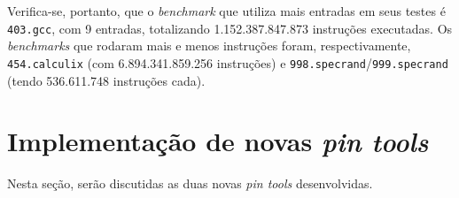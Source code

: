 \documentclass[12pt]{article}
\begin{document}

Verifica-se, portanto, que o \textit{benchmark} que utiliza mais entradas em
seus testes é \texttt{403.gcc}, com 9 entradas, totalizando 1.152.387.847.873
instruções executadas. Os \textit{benchmarks} que rodaram mais e menos instruções foram,
respectivamente, \texttt{454.calculix} (com 6.894.341.859.256 instruções) e
\texttt{998.specrand}/\texttt{999.specrand} (tendo 536.611.748 instruções cada). 


\section{Implementação de novas \textit{pin tools}} \label{sec:tool}

Nesta seção, serão discutidas as duas novas \textit{pin tools} desenvolvidas.
\end{document}
